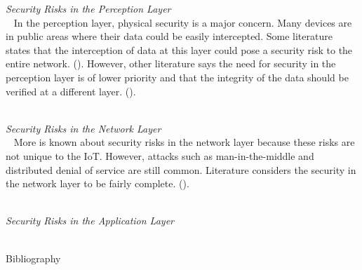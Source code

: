 \documentclass[letterpaper, 12pt]{texMemo}
\begin{document}
\begin{flushleft}
\textit{Security Risks in the Perception Layer}\\
~\newline
In the perception layer, physical security is a major concern. Many devices are in public areas where their data could be easily intercepted. Some literature states that the interception of
data at this layer could pose a security risk to the entire network. (\cite{Zhao6746513}). However, other literature says the need for security in the perception layer is of lower priority and that
the integrity of the data should be verified at a different layer. (\cite{Kozlov}).\\
~\newline

\textit{Security Risks in the Network Layer}\\
~\newline
More is known about security risks in the network layer because these risks are not unique to the IoT. However, attacks such as man-in-the-middle and distributed denial of service are still common. 
Literature considers the security in the network layer to be fairly complete. (\cite{Kozlov}).\\
~\newline

\textit{Security Risks in the Application Layer}\\
~\newline


\newpage
Bibliography\\
~\newline
{}\\
~\newline
{}\\
~\newline
{}\\
\end{flushleft}
\end{document}
